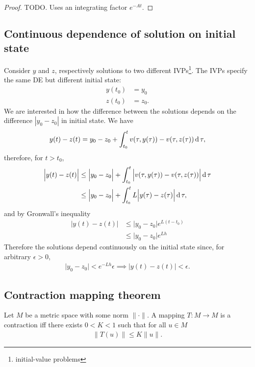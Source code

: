 \begin{proof}
TODO. Uses an integrating factor $e^{-At}$.
\end{proof}

\subsection{Continuous dependence of solution on initial state}
Consider $y$ and $z$, respectively solutions to two different
IVPs\footnote{initial-value problems}. The IVPs specify the same DE but
different initial state:
\begin{align*}
  y(t_0) &= y_0\\
  z(t_0) &= z_0.
\end{align*}
We are interested in how the difference between the solutions depends on the
difference $|y_0 - z_0|$ in initial state. We have
\begin{align*}
  y(t) - z(t) = y_0 - z_0 +
                \int_{t_0}^t v(\tau, y(\tau)) - v(\tau, z(\tau)) \operatorname{\text{d}}\tau,
\end{align*}
therefore, for $t > t_0$,
\begin{align*}
  \Big|y(t) - z(t)\Big| &\leq \Big|y_0 - z_0\Big| +
                              \int_{t_0}^t \Big|v(\tau, y(\tau)) - v(\tau, z(\tau))\Big| \operatorname{\text{d}}\tau\\
                        &\leq \Big|y_0 - z_0\Big| +
                              \int_{t_0}^t L\Big|y(\tau) - z(\tau)\Big| \operatorname{\text{d}}\tau,
\end{align*}
and by Gronwall's inequality
\begin{align*}
  \Big|y(t) - z(t)\Big| &\leq \Big|y_0 - z_0\Big|e^{L(t - t_0)}\\
                        &\leq \Big|y_0 - z_0\Big|e^{Lh}
\end{align*}
Therefore the solutions depend continuously on the initial state since, for
arbitrary $\epsilon > 0$,
\begin{align*}
  \Big|y_0 - z_0\Big| < e^{-Lh}\epsilon \implies \Big|y(t) - z(t)\Big| < \epsilon.
\end{align*}


\subsection{Contraction mapping theorem}

\begin{definition*}[Contraction]
  Let $M$ be a metric space with some norm $\|\cdot\|$. A mapping $T:M \to M$
  is a contraction iff there exists $0 < K < 1$ such that for all $u \in M$
  \begin{align*}
    \|T(u)\| \leq K\|u\|.
  \end{align*}
\end{definition*}


